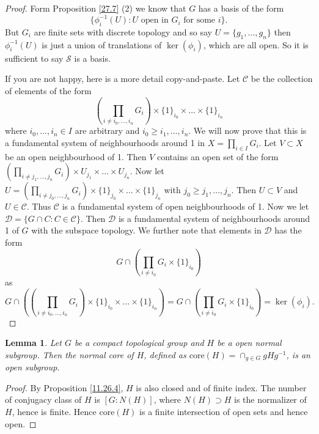 \documentclass[12pt]{report}
\newtheorem{lemma}[theorem]{Lemma}
\theoremstyle{definition}
\begin{document}
\begin{proof}
	Form Proposition \ref{27.7} (2) we know that $G$ has a basis of the form $$\{\phi_i^{-1}(U): U \mbox{ open in } G_i \mbox{ for some }i \}.$$
	But $G_i$ are finite sets with discrete topology and so say $U=\{g_1,\dots,g_n\}$ then $\phi_i^{-1}(U)$ is just a union of translations of $\ker(\phi_i)$, which are all open. So it is sufficient to say $\mathcal{S}$ is a basis.


	If you are not happy, here is a more detail copy-and-paste. Let $\mathcal{C}$ be the collection of elements of the form $$(\prod_{i\not= i_0,\dots,i_n}G_i)\times \{1\}_{i_0}\times \dots\times \{1\}_{i_n}$$ where $i_0,\dots,i_n\in I$ are arbitrary and $i_0\geq i_1,\dots,i_n$. We will now prove that this is a fundamental system of neighbourhoods around 1 in $X=\prod_{i\in I}G_i$. Let $V\subset X$ be an open neighbourhood of 1. Then $V$ contains an open set of the form $(\prod_{i\not= j_1,\dots,j_n}G_i)\times U_{j_1}\times \dots\times U_{j_n}$. Now let $U=(\prod_{i\not= j_0,\dots,j_n}G_i)\times \{1\}_{j_0}\times \dots\times \{1\}_{j_n}$ with $j_0\geq j_1,\dots,j_n$. Then $U\subset V$ and $U\in \mathcal{C}$. Thus $\mathcal{C}$ is a fundamental system of open neighbourhoods of 1. Now we let $\mathcal{D}=\{G\cap C: C\in\mathcal{C}\}$. Then $\mathcal{D}$ is a fundamental system of neighbourhoods around 1 of $G$ with the subspace topology. We further note that elements in $\mathcal{D}$ has the form
	$$G\cap(\prod_{i\not= i_0} G_i \times \{1\}_{i_0})$$
	as $$G\cap((\prod_{i\not= i_0,\dots,i_n}G_i)\times \{1\}_{i_0}\times \dots\times \{1\}_{i_n}) = G\cap(\prod_{i\not= i_0} G_i \times \{1\}_{i_0})=\ker(\phi_i).$$
\end{proof}


\begin{lemma}
	Let $G$ be a compact topological group and $H$ be a open normal subgroup. Then the normal core of $H$, defined as $\mbox{core}(H)=\cap_{g\in G}gHg^{-1}$, is an open subgroup.
\end{lemma}

\begin{proof}
	By Proposition \ref{11.26.4}, $H$ is also closed and of finite index. The number of conjugacy class of $H$ is $[G:N(H)]$, where $N(H)\supset H$ is the normalizer of $H$, hence is finite. Hence $\mbox{core}(H)$ is a finite intersection of open sets and hence open.
\end{proof}
\end{document}
